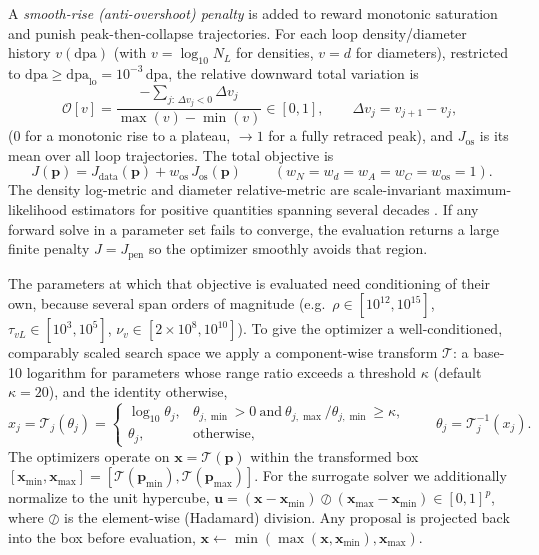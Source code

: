\documentclass{article}
\newcommand{\param}{\bm{p}}
\newcommand{\xv}{\bm{x}}
\newcommand{\dpa}{\mathrm{dpa}}
\newcommand{\NL}{N_{L}}
\begin{document}
A \emph{smooth-rise (anti-overshoot) penalty} is added to reward monotonic
saturation and punish peak-then-collapse trajectories. For each loop
density/diameter history $v(\dpa)$ (with $v=\log_{10}\NL$ for densities, $v=d$ for
diameters), restricted to $\dpa\ge\dpa_{\mathrm{lo}}=10^{-3}\,$dpa, the relative
downward total variation is
\begin{equation}
  \mathcal{O}[v]=\frac{-\sum_{j:\,\Delta v_j<0}\Delta v_j}{\max(v)-\min(v)}
  \in[0,1],\qquad \Delta v_j=v_{j+1}-v_j,
\end{equation}
($0$ for a monotonic rise to a plateau, $\to 1$ for a fully retraced peak), and
$J_{\mathrm{os}}$ is its mean over all loop trajectories. The total objective is
\begin{equation}
  \;J(\param)=J_{\mathrm{data}}(\param)+w_{\mathrm{os}}\,J_{\mathrm{os}}(\param)\;
  \qquad (w_N=w_d=w_A=w_C=w_{\mathrm{os}}=1).
  \label{eq:objective}
\end{equation}
The density log-metric and diameter relative-metric are scale-invariant
maximum-likelihood estimators for positive quantities spanning several decades
\citep{Tarantola2005}. If any forward solve in a parameter set fails to converge,
the evaluation returns a large finite penalty $J=J_{\mathrm{pen}}$ so the
optimizer smoothly avoids that region.

The parameters at which that objective is evaluated need conditioning of
their own, because several span orders of magnitude (e.g.\ $\rho\in[10^{12},10^{15}]$,
$\tau_{vL}\in[10^{3},10^{5}]$, $\nu_v\in[2\times10^{8},10^{10}]$). To give the
optimizer a well-conditioned, comparably scaled search space we apply a
component-wise transform $\mathcal{T}$: a base-10 logarithm for parameters whose
range ratio exceeds a threshold $\kappa$ (default $\kappa=20$), and the identity
otherwise,
\begin{equation}
  x_j=\mathcal{T}_j(\theta_j)=
  \begin{cases}
    \log_{10}\theta_j, & \theta_{j,\min}>0 \ \text{and}\ \theta_{j,\max}/\theta_{j,\min}\ge \kappa,\\[2pt]
    \theta_j, & \text{otherwise,}
  \end{cases}
  \qquad
  \theta_j=\mathcal{T}_j^{-1}(x_j).
  \label{eq:transform}
\end{equation}
The optimizers operate on $\xv=\mathcal{T}(\param)$ within the transformed box
$[\xv_{\min},\xv_{\max}]=[\mathcal{T}(\param_{\min}),\mathcal{T}(\param_{\max})]$.
For the surrogate solver we additionally normalize to the unit hypercube,
$\bm{u}=(\xv-\xv_{\min})\oslash(\xv_{\max}-\xv_{\min})\in[0,1]^{p}$, where $\oslash$
is the element-wise (Hadamard) division. Any proposal is projected back into the
box before evaluation, $\xv\leftarrow\min(\max(\xv,\xv_{\min}),\xv_{\max})$.
\end{document}
